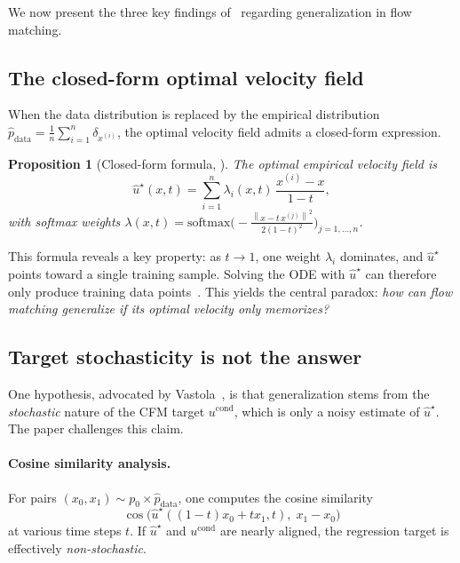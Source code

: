 \documentclass[10pt,a4paper]{article}
\newtheorem{proposition}{Proposition}
\theoremstyle{definition}
\newcommand{\norm}[1]{\left\lVert #1 \right\rVert}
\begin{document}
We now present the three key findings of~\cite{bertrand2025closed} regarding generalization in flow matching.

\subsection{The closed-form optimal velocity field}

When the data distribution is replaced by the empirical distribution $\hat{p}_{\mathrm{data}} = \frac{1}{n}\sum_{i=1}^n \delta_{x^{(i)}}$, the optimal velocity field admits a closed-form expression.

\begin{proposition}[Closed-form formula, {\cite[Prop.~1]{bertrand2025closed}}]\label{prop:closed-form}
The optimal empirical velocity field is
\begin{equation}\label{eq:closed-form}
    \hat{u}^\star(x, t) = \sum_{i=1}^n \lambda_i(x, t)\,\frac{x^{(i)} - x}{1 - t},
\end{equation}
with softmax weights $\lambda(x,t) = \mathrm{softmax}\!\Big(-\frac{\norm{x - t\,x^{(j)}}^2}{2(1-t)^2}\Big)_{j=1,\ldots,n}\!$.
\end{proposition}

This formula reveals a key property: as $t \to 1$, one weight $\lambda_i$ dominates, and $\hat{u}^\star$ points toward a single training sample.
Solving the ODE with $\hat{u}^\star$ can therefore only produce training data points~\cite{gao2024flow}.
This yields the central paradox: \emph{how can flow matching generalize if its optimal velocity only memorizes?}

\subsection{Target stochasticity is not the answer}\label{subsec:stochasticity}

One hypothesis, advocated by Vastola~\cite{vastola2025generalization}, is that generalization stems from the \emph{stochastic} nature of the CFM target $u^{\mathrm{cond}}$, which is only a noisy estimate of $\hat{u}^\star$.
The paper challenges this claim.

\paragraph{Cosine similarity analysis.}
For pairs $(x_0, x_1) \sim p_0 \times \hat{p}_{\mathrm{data}}$, one computes the cosine similarity
\[
    \cos\!\big(\hat{u}^\star((1-t)x_0 + tx_1, t),\; x_1 - x_0\big)
\]
at various time steps $t$.
If $\hat{u}^\star$ and $u^{\mathrm{cond}}$ are nearly aligned, the regression target is effectively \emph{non-stochastic}.
\end{document}
